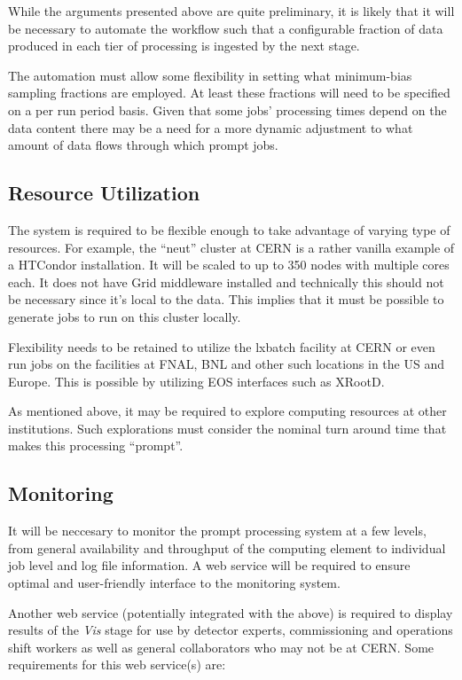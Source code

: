 \documentclass[pdftex,12pt,letter]{article}
\begin{document}
While the arguments presented above are quite preliminary, it is likely that it will be necessary to automate the workflow such that a configurable fraction
of data produced in each tier of processing is ingested by the next stage.

The automation must allow some flexibility in setting what
minimum-bias sampling fractions are employed.  At least these
fractions will need to be specified on a per run period basis.  Given
that some jobs' processing times depend on the data content there may
be a need for a more dynamic adjustment to what amount of data flows
through which prompt jobs.

\subsection{Resource Utilization}
The system is required to be flexible enough to take advantage of varying type of resources. For example, the ``neut'' cluster at CERN
is a rather vanilla example of a HTCondor installation. It will be scaled to up to 350 nodes with multiple cores each. It does not have Grid middleware
installed and technically this should not be necessary since it's local to the data. This implies that it must be possible to generate jobs to
run on this cluster locally.

Flexibility needs to be retained to utilize the lxbatch facility at CERN or even run jobs on the facilities at FNAL, BNL and other such locations
in the US and Europe. This is possible by utilizing EOS interfaces such as XRootD.

As mentioned above, it may be required to explore computing resources
at other institutions.  Such explorations must consider the nominal
turn around time that makes this processing ``prompt''.

\subsection{Monitoring}
It will be neccesary to monitor the prompt processing system at a few
levels, from general availability and throughput of the computing
element to individual job level and log file information.  A web
service will be required to ensure optimal and user-friendly interface
to the monitoring system.

Another web service (potentially integrated with the above) is
required to display results of the \textit{Vis} stage for use by
detector experts, commissioning and operations shift workers as well
as general collaborators who may not be at CERN.  Some requirements
for this web service(s) are:
\end{document}
